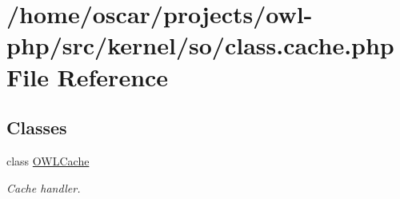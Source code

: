 \section{/home/oscar/projects/owl-\/php/src/kernel/so/class.cache.php File Reference}
\label{class_8cache_8php}
\subsection*{Classes}
\begin{DoxyCompactItemize}
\item 
class \hyperlink{classOWLCache}{OWLCache}
\begin{DoxyCompactList}\small\item\em Cache handler. \item\end{DoxyCompactList}\end{DoxyCompactItemize}
